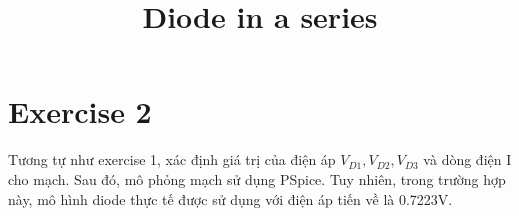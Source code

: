 \section{Exercise 2}
\title{Diode in a series}
Tương tự như exercise 1, xác định giá trị của điện áp \(V_{D1}, V_{D2}, V_{D3}\) và dòng điện I cho mạch. Sau đó, mô phỏng mạch sử dụng PSpice. Tuy nhiên, trong trường hợp này, mô hình diode thực tế được sử dụng với điện áp tiến về là 0.7223V.